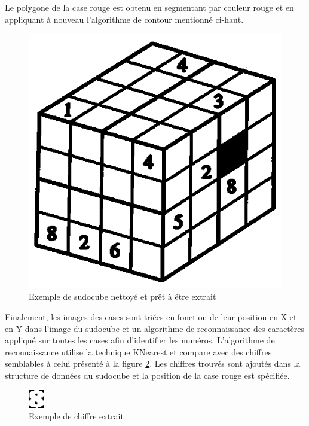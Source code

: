 Le polygone de la case rouge est obtenu en segmentant par couleur rouge et en appliquant à nouveau l'algorithme de contour mentionné ci-haut. 

\begin{figure}[h!]
\centering
\includegraphics[scale=0.60]{fig/sudocubeThresh.jpeg}
\caption{Exemple de sudocube nettoyé et prêt à être extrait}
\label{fig:sudocube_thresh}
\end{figure}

Finalement, les images des cases sont triées en fonction de leur position en X et en Y dans l'image du sudocube et un algorithme de reconnaissance des caractères appliqué sur toutes les cases afin d'identifier les numéros. L'algorithme de reconnaissance utilise la technique KNearest et compare avec des chiffres semblables à celui présenté à la figure \ref{fig:chiffre_extrait}. Les chiffres trouvés sont ajoutés dans la structure de données du sudocube et la position de la case rouge est spécifiée.

\begin{figure}[h!]
\centering
\includegraphics[scale=1]{fig/8Extrait.png}
\caption{Exemple de chiffre extrait}
\label{fig:chiffre_extrait}
\end{figure}

